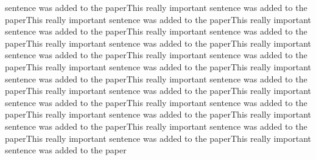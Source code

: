 \begin{revresponse}
\begin{changes}
sentence was added to the paperThis really important sentence was added to the paperThis really important sentence was added to the paperThis really important sentence was added to the paperThis really important sentence was added to the paperThis really important sentence was added to the paperThis really important sentence was added to the paperThis really important sentence was added to the paperThis really important sentence was added to the paperThis really important sentence was added to the paperThis really important sentence was added to the paperThis really important sentence was added to the paperThis really important sentence was added to the paperThis really important sentence was added to the paperThis really important sentence was added to the paperThis really important sentence was added to the paperThis really important sentence was added to the paperThis really important sentence was added to the paperThis really important sentence was added to the paper
	\end{changes}
\end{revresponse}